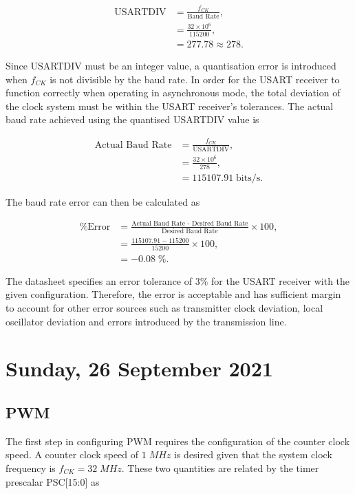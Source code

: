 \begin{align}
	\text{USARTDIV}&=\frac{f_{CK}}{\text{Baud Rate}},\\
	&=\frac{32\times10^6}{115200},\\
	&=277.78\approx278.
\end{align} 
	
Since USARTDIV must be an integer value, a quantisation error is introduced when $f_{CK}$ is not divisible by
the baud rate. In order for the \ac{USART} receiver to function correctly when operating in asynchronous mode, the total deviation of the clock system must be within the \ac{USART} receiver's tolerances. The actual baud rate achieved using the quantised USARTDIV value is 

\begin{align}
	\text{Actual Baud Rate}&=\frac{f_{CK}}{\text{USARTDIV}},\\
	&=\frac{32\times10^6}{278},\\
	&=115107.91\;\text{bits/s}.
\end{align}

The baud rate error can then be calculated as

\begin{align}
	\text{\% Error}&=\frac{\text{Actual Baud Rate - Desired Baud Rate}}{\text{Desired Baud Rate}} \times 100,\\
	&=\frac{115107.91-115200}{15200} \times 100,\\
	&=-0.08\;\text{\%}.
\end{align}

The datasheet specifies an error tolerance of $3\%$ for the \ac{USART} receiver with the given configuration. Therefore, the error is acceptable and has sufficient margin to account for other error sources such as transmitter clock deviation, local oscillator deviation and errors introduced by the transmission line.

\pendsign

\section[2021/09/26]{Sunday, 26 September 2021}

\subsection{\ac{PWM}}

The first step in configuring \ac{PWM} requires the configuration of the counter clock speed. A counter clock speed of $1\;MHz$ is desired given that the system clock frequency is $f_{CK}=32\;MHz$. These two quantities are related by the timer prescalar PSC[15:0] as

